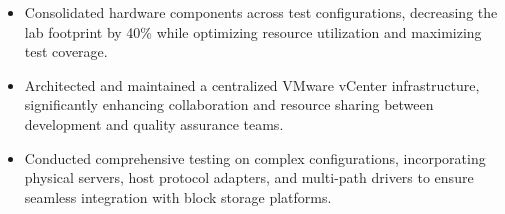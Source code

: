 \documentclass[10pt]{article}       %
\begin{document}
\begin{itemize}
  \item Consolidated hardware components across test configurations, decreasing the lab footprint by 40\% while optimizing resource utilization and maximizing test coverage.
  \item Architected and maintained a centralized VMware vCenter infrastructure, significantly enhancing collaboration and resource sharing between development and quality assurance teams.
  \item Conducted comprehensive testing on complex configurations, incorporating physical servers, host protocol adapters, and multi-path drivers to ensure seamless integration with block storage platforms.
\end{itemize}



\end{document}
